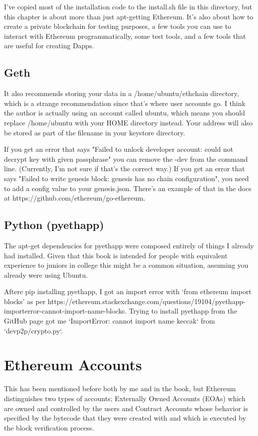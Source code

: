 \documentclass{article}
\begin{document}
I've copied most of the installation code to the install.sh file in this directory, but this chapter is about more than just apt-getting Ethereum. It's also about how to create a private blockchain for testing purposes, a few tools you can use to interact with Ethereum programmatically, some test tools, and a few tools that are useful for creating Dapps.

\subsection{Geth}
It also recommends storing your data in a /home/ubuntu/ethchain directory, which is a strange recommendation since that's where user accounts go. I think the author is actually using an account called ubuntu, which means you should replace /home/ubuntu with your HOME directory instead. Your address will also be stored as part of the filename in your keystore directory.

If you get an error that says "Failed to unlock developer account: could not decrypt key with given passphrase" you can remove the -dev from the command line.  (Currently, I'm not sure if that's the correct way.) If you get an error that says "Failed to write genesis block: genesis has no chain configuration", you need to add a config value to your genesis.json. There's an example of that
in the docs at https://github.com/ethereum/go-ethereum.


\subsection{Python (pyethapp)}
The apt-get dependencies for pyethapp were composed entirely of things I already had installed. Given that this book is intended
for people with equivalent experience to juniors in college this might be a common situation, assuming you already were using Ubuntu. %

Aftere pip installing pyethapp, I got an import error with `from ethereum import blocks' as per https://ethereum.stackexchange.com/questions/19104/pyethapp-importerror-cannot-import-name-blocks. Trying to install pyethapp from the GitHub page got me `ImportError: cannot import name keccak` from `devp2p/crypto.py`.


\section{Ethereum Accounts}
This has been mentioned before both by me and in the book, but Ethereum distinguishes two types of accounts; Externally Owned Accounts (EOAs) which are owned and controlled by the users and Contract Accounts whose behavior is specified by the bytecode that they were created with and which is executed by the block verification process.
\end{document}
